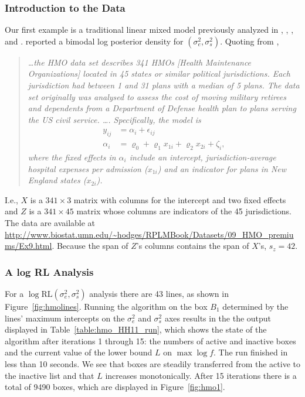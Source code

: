 \documentclass[ejs]{imsart}
\newcommand{\RLorig}{\text{RL}}
\newcommand{\logRLorig}{\log\RLorig}
\newcommand{\sigssq}{\sigma_s^2}
\newcommand{\sigesq}{\sigma_e^2}
\newcommand{\logRLssorig}{\logRLorig(\sigesq,\sigssq)}
\begin{document}
\subsubsection{Introduction to the Data}
Our first example is a traditional linear mixed model previously analyzed in \cite{hodges:98},  \cite{wakefield:1998}, \cite{hodges:2013}, and \cite{henn&hodges:2014}. \cite{wakefield:1998} reported a bimodal log posterior density for $(\sigesq,\sigssq)$.  Quoting from \cite{henn&hodges:2014},
\begin{quote}
\itshape
\dots the HMO data set describes 341 HMOs [Health Maintenance Organizations] located in 45 states or similar political jurisdictions.  Each jurisdiction had between 1 and 31 plans with a median of 5 plans.  The data set originally was analysed to assess the cost of moving military retirees and dependents from a Department of Defense health plan to plans serving the US civil service.  \dots.  Specifically, the model is
\begin{equation*}
\begin{split}
	y_{ij} &= \alpha_i + \epsilon_{ij}\\
	\alpha_i &= \varrho_0 + \varrho_1x_{1i} + \varrho_2x_{2i} + \zeta_i,
\end{split}
\end{equation*}
where the fixed effects in $\alpha_i$ include an intercept, jurisdiction-average hospital expenses per admission ($x_{1i}$) and an indicator for plans in New England states ($x_{2i}$).

\upshape
\end{quote}
I.e., $X$ is a $341 \times 3$ matrix with columns for the intercept and two fixed effects and $Z$ is a $341 \times 45$ matrix whose columns are indicators of the 45 jurisdictions.  The data are available at \url{http://www.biostat.umn.edu/~hodges/RPLMBook/Datasets/09_HMO_premiums/Ex9.html}.  Because the span of $Z$'s columns contains the span of $X$'s, $s_z = 42$.  

\subsubsection{A log RL Analysis}
For a $\logRLssorig$ analysis there are 43 lines, as shown in Figure~\ref{fig:hmolines}.
Running the algorithm on the box $B_1$ determined by the lines' maximum intercepts on the $\sigesq$ and $\sigssq$ axes results in the the output displayed in Table~\ref{table:hmo_HH11_run}, which shows the state of the algorithm after iterations 1 through 15: the numbers of active and inactive boxes and the current value of the lower bound $L$ on $\max\log f$. The run finished in less than 10 seconds.  We see that boxes are steadily transferred from the active to the inactive list and that $L$ increases monotonically.  After 15 iterations there is a total of 9490 boxes, which are displayed in Figure~\ref{fig:hmo1}.
\end{document}
